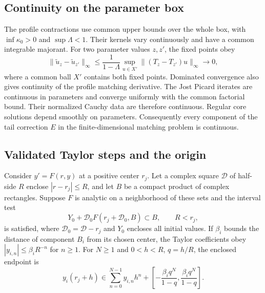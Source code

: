 \subsection{Continuity on the parameter box}
The profile contractions use common upper bounds over the whole box,
with $\inf\kappa_0>0$ and $\sup\Lambda<1$. Their kernels vary
continuously and have a common integrable majorant. For two parameter
values $z,z'$, the fixed points obey
\begin{equation}
 \|\widetilde u_z-\widetilde u_{z'}\|_\infty
 \leq\frac{1}{1-\Lambda}
       \sup_{u\in X'}\|(T_z-T_{z'})u\|_\infty\longrightarrow0,
\end{equation}
where a common ball $X'$ contains both fixed points.
Dominated convergence also gives continuity of the profile matching
derivative. The Jost Picard iterates are continuous in parameters and
converge uniformly with the common factorial bound. Their normalized
Cauchy data are therefore continuous. Regular core solutions depend
smoothly on parameters. Consequently every component of the tail
correction $E$ in the finite-dimensional matching problem is continuous.

\subsection{Validated Taylor steps and the origin}
\label{supp:taylor}
Consider $y'=F(r,y)$ at a positive center $r_j$. Let a complex square
$\mathcal D$ of half-side $R$ enclose $|r-r_j|\leq R$, and let $B$ be a
compact product of complex rectangles. Suppose $F$ is analytic on a
neighborhood of these sets and the interval test
\begin{equation}
 Y_0+\mathcal D_0 F(r_j+\mathcal D_0,B)\subset B,
 \qquad R<r_j,
 \label{supp:taylor-test}
\end{equation}
is satisfied, where $\mathcal D_0=\mathcal D-r_j$ and $Y_0$ encloses
all initial values. If $\beta_i$ bounds the distance of component $B_i$
from its chosen center, the Taylor coefficients obey
$|y_{i,n}|\leq\beta_iR^{-n}$ for $n\geq1$. For $N\geq1$ and
$0<h<R$, $q=h/R$, the enclosed endpoint is
\begin{equation}
 y_i(r_j+h)\in\sum_{n=0}^{N-1}y_{i,n}h^n+
 \left[-\frac{\beta_iq^N}{1-q},\frac{\beta_iq^N}{1-q}\right].
 \label{supp:taylor-remainder}
\end{equation}

